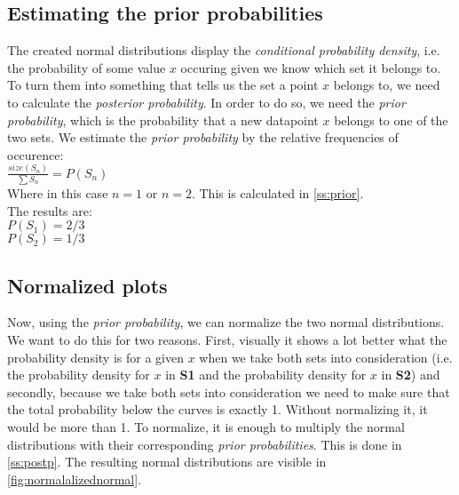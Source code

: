 \documentclass[10pt,a4paper]{article}
\begin{document}
\subsection{Estimating the prior probabilities}
The created normal distributions display the \textit{conditional probability density}, i.e. the probability of some value $x$ occuring given we know which set it belongs to. To turn them into something that tells us the set a point $x$ belongs to, we need to calculate the \textit{posterior probability}. In order to do so, we need the \textit{prior probability}, which is the probability that a new datapoint $x$ belongs to one of the two sets. We estimate the \textit{prior probability} by the relative frequencies of occurence:\\
$\frac{size(S_n)}{\sum S_n} = P(S_n)$\\
Where in this case $n = 1$ or $n = 2$. This is calculated in \autoref{ss:prior}.\\
The results are:\\
$P(S_1) = 2/3$\\
$P(S_2) = 1/3$\\

\subsection{Normalized plots}
Now, using the \textit{prior probability}, we can normalize the two normal distributions. We want to do this for two reasons. First, visually it shows a lot better what the probability density is for a given $x$ when we take both sets into consideration (i.e. the probability density for $x$ in \textbf{S1} and the probability density for $x$ in \textbf{S2}) and secondly, because we take both sets into consideration we need to make sure that the total probability below the curves is exactly 1. Without normalizing it, it would be more than 1. To normalize, it is enough to multiply the normal distributions with their corresponding \textit{prior probabilities}. This is done in \autoref{ss:postp}. The resulting normal distributions are visible in \autoref{fig:normalalizednormal}.
\end{document}
